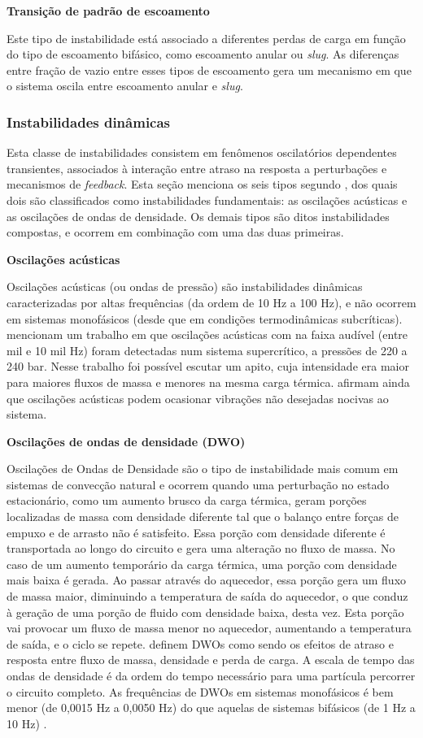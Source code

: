 \documentclass[a4paper,portuguese,10pt]{article}
\begin{document}
\textbf{Transição de padrão de escoamento}

Este tipo de instabilidade está associado a diferentes perdas de carga em função do tipo de escoamento bifásico, como escoamento anular ou {\it slug}. As diferenças entre fração de vazio entre esses tipos de escoamento gera um mecanismo em que o sistema oscila entre escoamento anular e {\it slug}.

\subsubsection{Instabilidades dinâmicas}

Esta classe de instabilidades consistem em fenômenos oscilatórios dependentes transientes, associados à interação entre atraso na resposta a perturbações e mecanismos de {\it feedback}. Esta seção menciona os seis tipos segundo \citet{PRASAD07}, dos quais dois são classificados como instabilidades fundamentais: as oscilações acústicas e as oscilações de ondas de densidade. Os demais tipos são ditos instabilidades compostas, e ocorrem em combinação com uma das duas primeiras.

\textbf{Oscilações acústicas}

Oscilações acústicas (ou ondas de pressão) são instabilidades dinâmicas caracterizadas por altas frequências (da ordem de 10 Hz a 100 Hz), e não ocorrem em sistemas monofásicos (desde que em condições termodinâmicas subcríticas). \citet{BOURE73} mencionam um trabalho em que oscilações acústicas com na faixa audível (entre mil e 10 mil Hz) foram detectadas num sistema supercrítico, a pressões de 220 a 240 bar. Nesse trabalho foi possível escutar um apito, cuja intensidade era maior para maiores fluxos de massa e menores na mesma carga térmica. \citet{BOURE73} afirmam ainda que oscilações acústicas podem ocasionar vibrações não desejadas nocivas ao sistema.

\textbf{Oscilações de ondas de densidade (DWO)}

Oscilações de Ondas de Densidade são o tipo de instabilidade mais comum em sistemas de convecção natural e ocorrem quando uma perturbação no estado estacionário, como um aumento brusco da carga térmica, geram porções localizadas de massa com densidade diferente tal que o balanço entre forças de empuxo e de arrasto não é satisfeito. Essa porção com densidade diferente é transportada ao longo do circuito e gera uma alteração no fluxo de massa. No caso de um aumento temporário da carga térmica, uma porção com densidade mais baixa é gerada. Ao passar através do aquecedor, essa porção gera um fluxo de massa maior, diminuindo a temperatura de saída do aquecedor, o que conduz à geração de uma porção de fluido com densidade baixa, desta vez. Esta porção vai provocar um fluxo de massa menor no aquecedor, aumentando a temperatura de saída, e o ciclo se repete. \citet{BOURE73} definem DWOs como sendo os efeitos de atraso e resposta entre fluxo de massa, densidade e perda de carga. A escala de tempo das ondas de densidade é da ordem do tempo necessário para uma partícula percorrer o circuito completo. As frequências de DWOs em sistemas monofásicos é bem menor (de 0,0015 Hz a 0,0050 Hz) do que aquelas de sistemas bifásicos (de 1 Hz a 10 Hz) \cite{VIJAYAN05b}.
\end{document}

